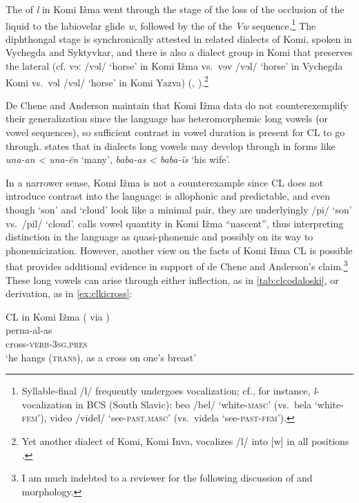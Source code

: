\documentclass[output=paper,
modfonts
]{LSP/langsci}
\begin{document}
The  of \emph{l} in Komi Ižma went through the stage of the loss
of the occlusion of the liquid to the labiovelar glide \emph{w},
followed by the  of the \emph{Vw} sequence.\footnote{Syllable-final
  /l/ frequently undergoes vocalization; cf., for instance,
  \emph{l}-vocalization in BCS (South Slavic): beo /bel/
  `white-\textsc{masc'} (vs.\ bela `white-\textsc{fem'}), video /videl/
  `see-\textsc{past.masc}' (vs.\ videla `see-\textsc{past-fem}').} The
diphthongal stage is synchronically attested in related dialects of
Komi, spoken in Vychegda and Syktyvkar, and there is also a dialect
group in Komi that preserves the lateral (cf. vɘː /vɘl/ `horse' in Komi
Ižma vs.\ vɘv /vɘl/ `horse' in Vychegda Komi vs.\ vɘl /vɘl/ `horse' in
Komi Yazva) (\citealt[44--49]{lytkin1966}, \citealt[106--115]{lytkin1976}).\footnote{Yet another dialect of Komi, Komi Inva,
  vocalizes /l/ into {[}w{]} in all positions \citep[44--49]{lytkin1966}.}

De Chene and Anderson \citeyearpar{deChene1979} maintain that Komi Ižma data do not
counterexemplify their generalization since the language has
heteromorphemic long vowels (or vowel sequences), so sufficient contrast
in vowel duration is present for CL to go through. \citet[309]{hausenberg1998} states that in dialects long vowels may develop through
 in forms like \emph{una-an} \emph{\textless{} una-ën}
`many', \emph{baba-as} \emph{\textless{} baba-ïs} `his wife'.

In a narrower sense, Komi Ižma is not a counterexample since CL does not
introduce  contrast into the language:  is
allophonic and predictable, and even though `son' and `cloud' look like
a minimal pair, they are underlyingly /pi/ `son' vs.\ /pil/ `cloud'.
\citet[13]{abondolo1998} calls vowel quantity in Komi Ižma ``nascent'', thus
interpreting  distinction in the language as quasi-phonemic
and possibly on its way to phonemicization. However, another view on the
facts of Komi Ižma CL is possible that provides additional evidence in
support of de Chene and Anderson's claim.\footnote{I am much indebted to
  a reviewer for the following discussion of  and
  morphology.} These long vowels can arise through either inflection, as
in \cref{tab:clcodaloski}, or derivation, as in ‎\cref{ex:clkicross}:

\ea\label{ex:clkicross}CL in Komi Ižma (\citealt[309]{collinder1957} via \citealt[525]{deChene1979})\\
		\gll perna-al-as \\
		cross-\textsc{verb-3sg.pres}\\
		\glt `he hangs (\textsc{trans}), as a cross on one's breast'
\z
\end{document}
